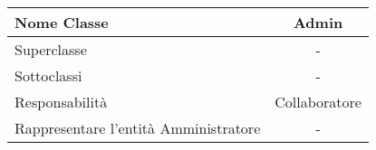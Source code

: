 
\setcounter{table}{0}
\begin{table}[H]
    \centering
    \begin{tabular}{||   l  ||  c   ||}
        \rowcolor{Gray}
        \hline
        Nome Classe & Admin\\
        \hline
        Superclasse  &  - \\
        \hline
        Sottoclassi & - \\
        \hline
        \hline
         Responsabilità & Collaboratore \\
         \hline
          Rappresentare l'entità Amministratore & - \\
         \hline
    \end{tabular}
\end{table}

    
       
